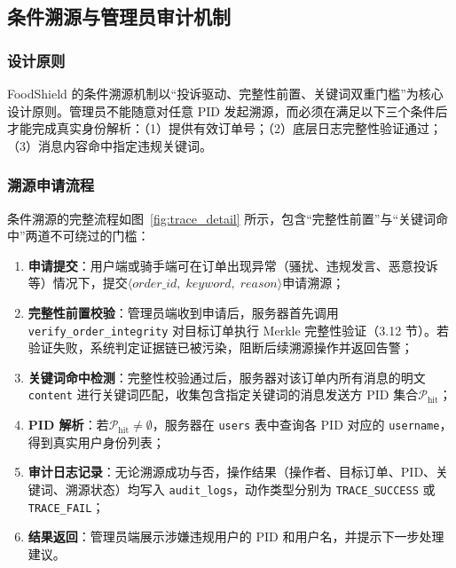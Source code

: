 \subsection{条件溯源与管理员审计机制}
\label{subsec:trace}

\subsubsection*{设计原则}

FoodShield 的条件溯源机制以“投诉驱动、完整性前置、关键词双重门槛”为核心设计原则。管理员不能随意对任意 PID 发起溯源，而必须在满足以下三个条件后才能完成真实身份解析：（1）提供有效订单号；（2）底层日志完整性验证通过；（3）消息内容命中指定违规关键词。

\subsubsection*{溯源申请流程}

条件溯源的完整流程如图~\ref{fig:trace_detail} 所示，包含“完整性前置”与“关键词命中”两道不可绕过的门槛：



\begin{enumerate}[label=\arabic*., leftmargin=2em]
  \item \textbf{申请提交}：用户端或骑手端可在订单出现异常（骚扰、违规发言、恶意投诉等）情况下，提交$\langle\mathit{order\_id},\; \mathit{keyword},\; \mathit{reason}\rangle$申请溯源；
  \item \textbf{完整性前置校验}：管理员端收到申请后，服务器首先调用 \texttt{verify\_order\_integrity} 对目标订单执行 Merkle 完整性验证（3.12 节）。若验证失败，系统判定证据链已被污染，阻断后续溯源操作并返回告警；
  \item \textbf{关键词命中检测}：完整性校验通过后，服务器对该订单内所有消息的明文 \texttt{content} 进行关键词匹配，收集包含指定关键词的消息发送方 PID 集合$\mathcal{P}_{\mathrm{hit}}$；
  \item \textbf{PID 解析}：若$\mathcal{P}_{\mathrm{hit}} \neq \emptyset$，服务器在 \texttt{users} 表中查询各 PID 对应的 \texttt{username}，得到真实用户身份列表；
  \item \textbf{审计日志记录}：无论溯源成功与否，操作结果（操作者、目标订单、PID、关键词、溯源状态）均写入 \texttt{audit\_logs}，动作类型分别为 \texttt{TRACE\_SUCCESS} 或 \texttt{TRACE\_FAIL}；
  \item \textbf{结果返回}：管理员端展示涉嫌违规用户的 PID 和用户名，并提示下一步处理建议。
\end{enumerate}

